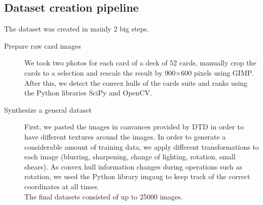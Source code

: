 \documentclass[a0,landscape]{a0poster}
\begin{document}
\begin{multicols}{3}
\subsection*{Dataset creation pipeline}
The dataset was created in mainly 2 big steps. \\
\begin{description}
\item[Prepare raw card images] We took two photos for each card of a deck of 52 cards, manually crop the cards to a selection and rescale the result by 900$\times$600 pixels using GIMP.
After this, we detect the convex hulls of the cards suits and ranks using the Python libraries SciPy and OpenCV.  \\
\item[Synthesize a general dataset]  First, we pasted the images in canvances provided by DTD \cite{cimpoi14describing} in order to have different textures around the images.
In order to generate a considerable amount of training data, we apply different transformations to each image (blurring, sharpening, change of lighting, rotation, small shears).
As convex hull information changes during operations such as rotation, we used the Python library imgaug to keep track of the correct coordinates at all times. \\
The final datasets consisted of up to 25000 images.
\end{description}





\end{multicols}
\end{document}
